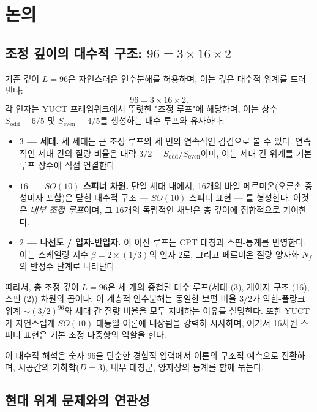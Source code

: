 \documentclass[11pt,a4paper]{article}
\newcommand{\Sodd}{S_{\mathrm{odd}}}
\newcommand{\Seven}{S_{\mathrm{even}}}
\begin{document}
	\section{논의}
	\label{sec:discussion}
	
	\subsection{조정 깊이의 대수적 구조: \(96 = 3 \times 16 \times 2\)}
	
	기준 깊이 \(L = 96\)은 자연스러운 인수분해를 허용하며, 이는 깊은 대수적 위계를 드러낸다:
	\[
	96 = 3 \times 16 \times 2.
	\]
	각 인자는 YUCT 프레임워크에서 뚜렷한 "조정 루프"에 해당하며, 이는 상수 \(\Sodd = 6/5\) 및 \(\Seven = 4/5\)를 생성하는 대수 루프와 유사하다:
	
	\begin{itemize}
		\item \textbf{\(3\) — 세대.} 세 세대는 큰 조정 루프의 세 번의 연속적인 감김으로 볼 수 있다. 연속적인 세대 간의 질량 비율은 대략 \(3/2 = \Sodd/\Seven\)이며, 이는 세대 간 위계를 기본 루프 상수에 직접 연결한다.
		\item \textbf{\(16\) — \(SO(10)\) 스피너 차원.} 단일 세대 내에서, 16개의 바일 페르미온(오른손 중성미자 포함)은 닫힌 대수적 구조 — \(SO(10)\) 스피너 표현 — 를 형성한다. 이것은 \emph{내부 조정 루프}이며, 그 16개의 독립적인 채널은 총 깊이에 집합적으로 기여한다.
		\item \textbf{\(2\) — 나선도 / 입자-반입자.} 이 이진 루프는 CPT 대칭과 스핀-통계를 반영한다. 이는 스케일링 지수 \(\beta = 2 \times (1/3)\)의 인자 2로, 그리고 페르미온 질량 양자화 \(N_f\)의 반정수 단계로 나타난다.
	\end{itemize}
	
	따라서, 총 조정 깊이 \(L = 96\)은 세 개의 중첩된 대수 루프(세대 (3), 게이지 구조 (16), 스핀 (2)) 차원의 곱이다. 이 계층적 인수분해는 동일한 보편 비율 \(3/2\)가 약한-플랑크 위계 \(\sim (3/2)^{96}\)와 세대 간 질량 비율을 모두 지배하는 이유를 설명한다. 또한 YUCT가 자연스럽게 \(SO(10)\) 대통일 이론에 내장됨을 강력히 시사하며, 여기서 16차원 스피너 표현은 기본 조정 다중항의 역할을 한다.
	
	이 대수적 해석은 숫자 96을 단순한 경험적 입력에서 이론의 구조적 예측으로 전환하며, 시공간의 기하학(\(D=3\)), 내부 대칭군, 양자장의 통계를 함께 묶는다.
	
	\subsection{현대 위계 문제와의 연관성}
	
\end{document}
